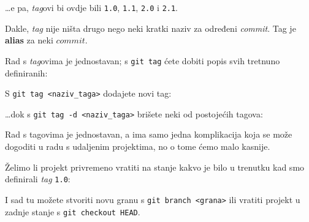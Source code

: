 

\dots{}e pa, \emph{tag}ovi bi ovdje bili \verb+1.0+, \verb+1.1+, \verb+2.0+ i \verb+2.1+.

Dakle, \emph{tag} nije ništa drugo nego neki kratki naziv za određeni \emph{commit}.
Tag je \textbf{alias} za neki $commit$.

Rad s \emph{tag}ovima je jednostavan; s \verb+git tag+ ćete dobiti popis svih tretnuno definiranih:



S \verb+git tag <naziv_taga>+ dodajete novi tag:


\dots{}dok s \verb+git tag -d <naziv_taga>+ brišete neki od postojećih tagova:


Rad s tagovima je jednostavan, a ima samo jedna komplikacija koja se može dogoditi u radu s udaljenim projektima, no o tome ćemo malo kasnije.

Želimo li projekt privremeno vratiti na stanje kakvo je bilo u trenutku kad smo definirali \emph{tag} \verb+1.0+:


I sad tu možete stvoriti novu granu s \verb+git branch <grana>+ ili vratiti projekt u zadnje stanje s \verb+git checkout HEAD+.

